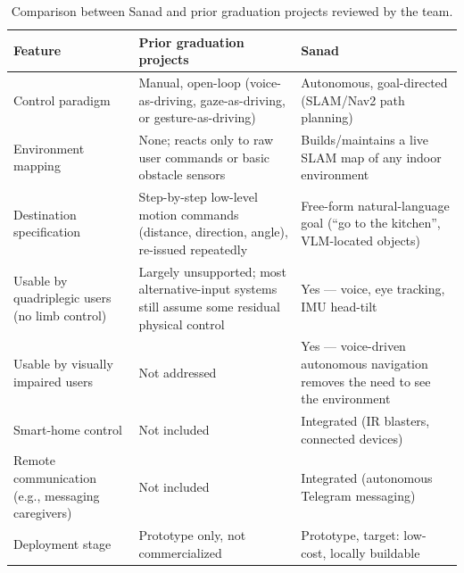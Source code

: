 \begin{table}[H]
\centering
\caption{Comparison between Sanad and prior graduation projects reviewed by the team.}
\begin{tabular}{|p{4cm}|p{5.7cm}|p{5.7cm}|}
\hline
\textbf{Feature} & \textbf{Prior graduation projects} & \textbf{Sanad} \\
\hline
Control paradigm & Manual, open-loop (voice-as-driving, gaze-as-driving, or gesture-as-driving) & Autonomous, goal-directed (SLAM/Nav2 path planning) \\
\hline
Environment mapping & None; reacts only to raw user commands or basic obstacle sensors & Builds/maintains a live SLAM map of any indoor environment \\
\hline
Destination specification & Step-by-step low-level motion commands (distance, direction, angle), re-issued repeatedly & Free-form natural-language goal (``go to the kitchen'', VLM-located objects) \\
\hline
Usable by quadriplegic users (no limb control) & Largely unsupported; most alternative-input systems still assume some residual physical control & Yes --- voice, eye tracking, IMU head-tilt \\
\hline
Usable by visually impaired users & Not addressed & Yes --- voice-driven autonomous navigation removes the need to see the environment \\
\hline
Smart-home control & Not included & Integrated (IR blasters, connected devices) \\
\hline
Remote communication (e.g., messaging caregivers) & Not included & Integrated (autonomous Telegram messaging) \\
\hline
Deployment stage & Prototype only, not commercialized & Prototype, target: low-cost, locally buildable \\
\hline
\end{tabular}
\label{table:grad_projects_comparison}
\end{table}

